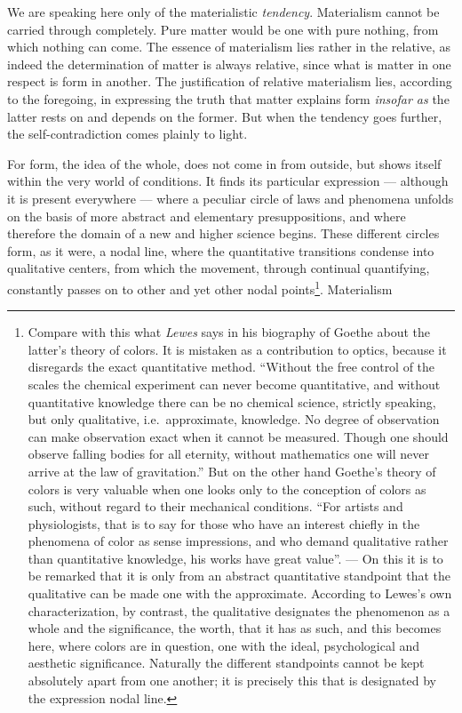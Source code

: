 \documentclass[12pt,a4paper,openany]{book}
\newcommand{\opage}[1]{\marginnote{\footnotesize\textit{[#1]}}}
\begin{document}
We are speaking here only of the materialistic \emph{tendency}.
Materialism cannot be carried through completely. Pure
matter would be one with pure nothing, from which nothing can
come. The essence of materialism lies rather in the relative,
as indeed the determination of matter is always relative, since
what is matter in one respect is form in another.
\opage{197}The justification of relative materialism lies, according to the
foregoing, in expressing the truth that matter explains
form \emph{insofar as} the latter rests on and depends on the former.
But when the tendency goes further, the self-contradiction comes
plainly to light.

For form, the idea of the whole, does not come in from outside,
but shows itself within the very world of
conditions. It finds its particular expression --- although it is
present everywhere --- where a peculiar circle of laws and
phenomena unfolds on the basis of more abstract and
elementary presuppositions, and where therefore the domain of a new and higher
science begins. These different circles
form, as it were, a nodal line, where the quantitative transitions
condense into qualitative centers, from which the movement,
through continual quantifying, constantly passes on to
other and yet other nodal points\footnote{Compare with this what \emph{Lewes} says in his biography of Goethe about the latter's theory of colors. It is mistaken as a contribution to optics, because it disregards the exact quantitative method. ``Without the free control of the scales the chemical experiment can never become quantitative, and without quantitative knowledge there can be no chemical science, strictly speaking, but only qualitative, i.e.\ approximate, knowledge. No degree of observation can make observation exact when it cannot be measured. Though one should observe falling bodies for all eternity, without mathematics one will never arrive at the law of gravitation.'' But on the other hand Goethe's theory of colors is very valuable when one looks only to the conception of colors as such, without regard to their mechanical conditions. ``For artists and physiologists, that is to say for those who have an interest chiefly in the phenomena of color as sense impressions, and who demand qualitative rather than quantitative knowledge, his works have great value''. --- On this it is to be remarked that it is only from an abstract quantitative standpoint that the qualitative can be made one with the approximate. According to Lewes's own characterization, by contrast, the qualitative designates the phenomenon as a whole and the significance, the worth, that it has as such, and this becomes here, where colors are in question, one with the ideal, psychological and aesthetic significance. Naturally the different standpoints cannot be kept absolutely apart from one another; it is precisely this that is designated by the expression nodal line.}. Materialism
\end{document}
